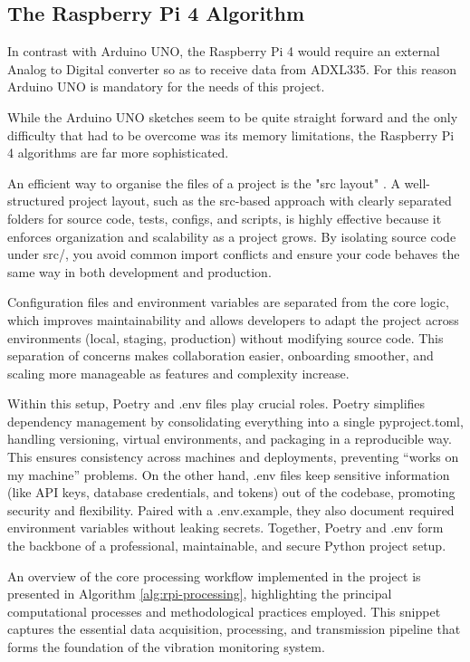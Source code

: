 \subsection{The Raspberry Pi 4 Algorithm} 
{
	 In contrast with Arduino UNO, the Raspberry Pi 4 would require an external Analog to Digital converter so as to receive data from ADXL335. For this reason Arduino UNO is mandatory for the needs of this project.
	 
	 While the Arduino UNO sketches seem to be quite straight forward and the only difficulty that had to be overcome was its memory limitations, the Raspberry Pi 4 algorithms are far more sophisticated. 
	
	An efficient way to organise the files of a project is the "src layout" \cite{srclayout}. A well-structured project layout, such as the src-based approach with clearly separated folders for source code, tests, configs, and scripts, is highly effective because it enforces organization and scalability as a project grows. By isolating source code under src/, you avoid common import conflicts and ensure your code behaves the same way in both development and production. 
	
	Configuration files and environment variables are separated from the core logic, which improves maintainability and allows developers to adapt the project across environments (local, staging, production) without modifying source code. This separation of concerns makes collaboration easier, onboarding smoother, and scaling more manageable as features and complexity increase.
	
	Within this setup, Poetry and .env files play crucial roles. Poetry simplifies dependency management by consolidating everything into a single pyproject.toml, handling versioning, virtual environments, and packaging in a reproducible way. This ensures consistency across machines and deployments, preventing “works on my machine” problems. On the other hand, .env files keep sensitive information (like API keys, database credentials, and tokens) out of the codebase, promoting security and flexibility. Paired with a .env.example, they also document required environment variables without leaking secrets. Together, Poetry and .env form the backbone of a professional, maintainable, and secure Python project setup.
	
	An overview of the core processing workflow implemented in the project is presented in Algorithm \ref{alg:rpi-processing}, highlighting the principal computational processes and methodological practices employed. This snippet captures the essential data acquisition, processing, and transmission pipeline that forms the foundation of the vibration monitoring system.

}
